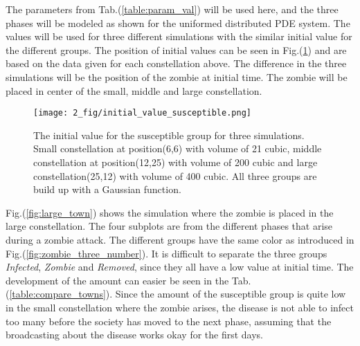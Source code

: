 \documentclass[%
twoside,                 %
final,                   %
chapterprefix=true,      %
open=right               %
10pt]{book}
\begin{document}
The parameters from Tab.(\ref{table:param_val}) will be used here, and the three phases will be modeled as shown for the uniformed distributed PDE system. The values will be used for three different simulations with the similar initial value for the different groups. The position of initial values can be seen in Fig.(\ref{fig:initial_value_susceptible}) and are based on the data given for each constellation above. The difference in the three simulations will be the position of the zombie at initial time. The zombie will be placed in center of the small, middle and large constellation.


\begin{figure}[ht]
  \centerline{\texttt{[image: 2\_fig/initial\_value\_susceptible.png]}}
  \caption{
  \label{fig:initial_value_susceptible} The initial value for the susceptible group for three simulations. Small constellation at position(6,6) with volume of 21 cubic, middle constellation at position(12,25) with volume of 200 cubic and large constellation(25,12) with volume of 400 cubic. All three groups are build up with a Gaussian function.
  }
\end{figure}




\vspace{3mm}




\vspace{3mm}


Fig.(\ref{fig:large_town}) shows the simulation where the zombie is placed in the large constellation. The four subplots are from the different phases that arise during a zombie attack. The different groups have the same color as introduced in Fig.(\ref{fig:zombie_three_number}). It is difficult to separate the three groups \emph{Infected}, \emph{Zombie} and \emph{Removed}, since they all have a low value at initial time. The development of the amount can easier be seen in the Tab.(\ref{table:compare_towns}). Since the amount of the susceptible group is quite low in the small constellation where the zombie arises, the disease is not able to infect too many before the society has moved to the next phase, assuming that the broadcasting about the disease works okay for the first days. 


\vspace{3mm}




\vspace{3mm}
\end{document}
